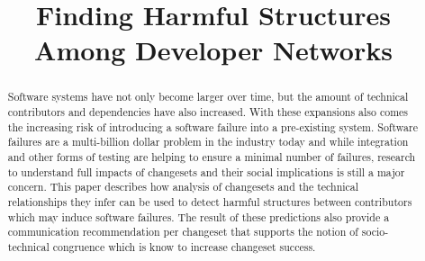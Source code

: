 \documentclass[conference]{IEEEtran}
\begin{document}
\title{Finding Harmful Structures Among Developer Networks}

\author{
}

\maketitle


\begin{abstract}
Software systems have not only become larger over time, but the amount of
technical contributors and dependencies have also increased. With these expansions also comes
the increasing risk of introducing a software failure into a pre-existing system.
Software failures are a multi-billion dollar problem in the industry today and while integration and
other forms of testing are helping to ensure a minimal number of failures, research to understand
full impacts of changesets and their social implications is still a major concern. This paper describes
how analysis of changesets and the technical relationships they infer can be used to detect harmful
structures between contributors which may induce software failures. The result of these predictions
also provide a communication recommendation per changeset that supports the notion of
socio-technical congruence which is know to increase changeset success.
\end{abstract}
\end{document}
